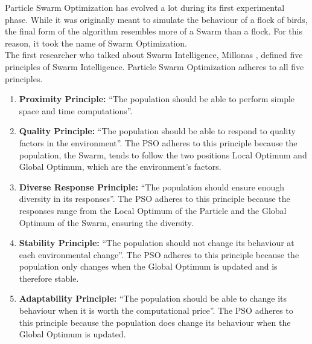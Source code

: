 Particle Swarm Optimization has evolved a lot during its first experimental phase.
While it was originally meant to simulate the behaviour of a flock of birds, the final form of the algorithm resembles more of a Swarm than a flock. For this reason, it took the name of Swarm Optimization.
\\[0.3cm]The first researcher who talked about Swarm Intelligence, Millonas \cite{SwarmIntelligence}, defined five principles of Swarm Intelligence.
Particle Swarm Optimization adheres to all five principles.
\begin{enumerate}[itemsep=0.1cm]
    \item \textbf{Proximity Principle:} “The population should be able to perform simple space and time computations”.
	\item \textbf{Quality Principle:} “The population should be able to respond to quality factors in the environment”.
	The PSO adheres to this principle because the population, the Swarm, tends to follow the two positions Local Optimum and Global Optimum, which are the environment's factors.
	\item \textbf{Diverse Response Principle:} “The population should ensure enough diversity in its responses”.
	The PSO adheres to this principle because the responses range from the Local Optimum of the Particle and the Global Optimum of the Swarm, ensuring the diversity.
	\item \textbf{Stability Principle:} “The population should not change its behaviour at each environmental change”.
	The PSO adheres to this principle because the population only changes when the Global Optimum is updated and is therefore stable.
	\item \textbf{Adaptability Principle:} “The population should be able to change its behaviour when it is worth the computational price”.
	The PSO adheres to this principle because the population does change its behaviour when the Global Optimum is updated.
\end{enumerate}
% 
% 
% 
